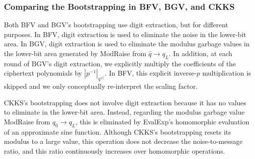 \subsubsection{Comparing the Bootstrapping in BFV, BGV, and CKKS} 
\label{subsubsec:bootstrapping-differences}

Both BFV and BGV's bootstrapping use digit extraction, but for different purposes. In BFV, digit extraction is used to eliminate the noise in the lower-bit area. In BGV, digit extraction is used to eliminate the modulus garbage values in the lower-bit area generated by \textsf{ModRaise} from $\hat{q}\rightarrow q_L$. In addition, at each round of BGV's digit extraction, we explicitly multiply the coefficients of the ciphertext polynomials by $|p^{-1}|_{q^{\langle i \rangle}}$. In BFV, this explicit inverse-$p$ multiplication is skipped and we only conceptually re-interpret the scaling factor. 

CKKS's bootstrapping does not involve digit extraction because it has no values to eliminate in the lower-bit area. Instead, regarding the modulus garbage value \textsf{ModRaise} from $q_0 \rightarrow q_L$, this is eliminated by \textsf{EvalExp}'s homomorphic evaluation of an approximate sine function. Although CKKS's bootstrapping resets its modulus to a large value, this operation does not decrease the noise-to-message ratio, and this ratio continuously increases over homomorphic operations. 



